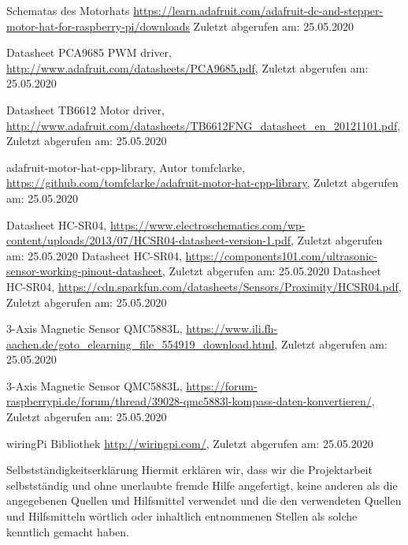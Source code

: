 \documentclass[12pt]{report}
\begin{document}
\begin{thebibliography}{9}

        Schematas des Motorhats
        \url{https://learn.adafruit.com/adafruit-dc-and-stepper-motor-hat-for-raspberry-pi/downloads}
        Zuletzt abgerufen am: 25.05.2020

        Datasheet PCA9685 PWM driver,
        \url{http://www.adafruit.com/datasheets/PCA9685.pdf},
        Zuletzt abgerufen am: 25.05.2020

        Datasheet TB6612 Motor driver,
        \url{http://www.adafruit.com/datasheets/TB6612FNG_datasheet_en_20121101.pdf},
        Zuletzt abgerufen am: 25.05.2020

        adafruit-motor-hat-cpp-library,
        Autor tomfclarke,
        \url{https://github.com/tomfclarke/adafruit-motor-hat-cpp-library},
        Zuletzt abgerufen am: 25.05.2020


        Datasheet HC-SR04,
        \url{https://www.electroschematics.com/wp-content/uploads/2013/07/HCSR04-datasheet-version-1.pdf},
        Zuletzt abgerufen am: 25.05.2020
        Datasheet HC-SR04,
        \url{https://components101.com/ultrasonic-sensor-working-pinout-datasheet},
        Zuletzt abgerufen am: 25.05.2020
        Datasheet HC-SR04,
        \url{https://cdn.sparkfun.com/datasheets/Sensors/Proximity/HCSR04.pdf},
        Zuletzt abgerufen am: 25.05.2020

        3-Axis Magnetic Sensor QMC5883L,
        \url{https://www.ili.fh-aachen.de/goto_elearning_file_554919_download.html},
        Zuletzt abgerufen am: 25.05.2020

        3-Axis Magnetic Sensor QMC5883L,
        \url{https://forum-raspberrypi.de/forum/thread/39028-qmc5883l-kompass-daten-konvertieren/},
        Zuletzt abgerufen am: 25.05.2020

        wiringPi Bibliothek
        \url{http://wiringpi.com/},
        Zuletzt abgerufen am: 25.05.2020


\end{thebibliography}


\pagebreak
\begin{section}{Selbstständigkeitserklärung}
    Hiermit erklären wir, dass wir die Projektarbeit selbstständig und ohne
    unerlaubte fremde Hilfe angefertigt, keine anderen als die
    angegebenen Quellen und Hilfsmittel verwendet und die den verwendeten Quellen
    und Hilfsmitteln wörtlich oder inhaltlich entnommenen Stellen als solche kenntlich
    gemacht haben.
\end{section}
\end{document}
